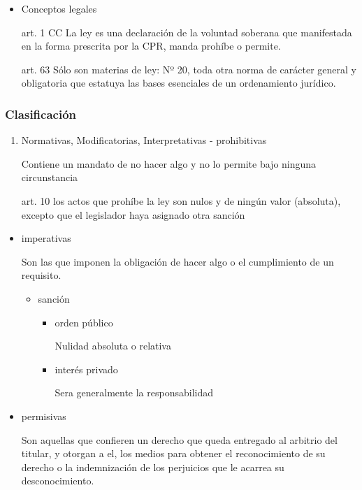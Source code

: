 \documentclass[]{article}
\providecommand{\tightlist}{%
  \setlength{\itemsep}{0pt}\setlength{\parskip}{0pt}}
\begin{document}
\begin{itemize}
\item
  Conceptos legales

  art. 1 CC La ley es una declaración de la voluntad soberana que
  manifestada en la forma prescrita por la CPR, manda prohíbe o permite.

  art. 63 Sólo son materias de ley: Nº 20, toda otra norma de carácter
  general y obligatoria que estatuya las bases esenciales de un
  ordenamiento jurídico.
\end{itemize}

\hypertarget{clasificaciuxf3n}{%
\subsubsection{Clasificación}\label{clasificaciuxf3n}}

\begin{enumerate}
\def\labelenumi{\arabic{enumi}.}
\item
  Normativas, Modificatorias, Interpretativas - prohibitivas

  Contiene un mandato de no hacer algo y no lo permite bajo ninguna
  circunstancia

  art. 10 los actos que prohíbe la ley son nulos y de ningún valor
  (absoluta), excepto que el legislador haya asignado otra sanción
\end{enumerate}

\begin{itemize}
\item
  imperativas

  Son las que imponen la obligación de hacer algo o el cumplimiento de
  un requisito.

  \begin{itemize}
  \tightlist
  \item
    sanción

    \begin{itemize}
    \item
      orden público

      Nulidad absoluta o relativa
    \item
      interés privado

      Sera generalmente la responsabilidad
    \end{itemize}
  \end{itemize}
\item
  permisivas

  Son aquellas que confieren un derecho que queda entregado al arbitrio
  del titular, y otorgan a el, los medios para obtener el reconocimiento
  de su derecho o la indemnización de los perjuicios que le acarrea su
  desconocimiento.
\end{itemize}
\end{document}
